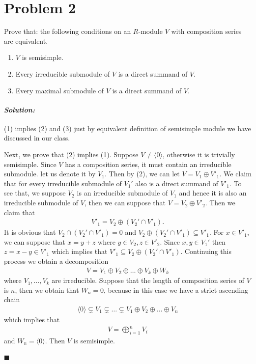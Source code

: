 \documentclass[12pt, a4paper]{article}
\theoremstyle{remark}
\newenvironment{solution}
  {\paragraph{\textit{Solution:}}\par\medskip}
  {\hfill$\blacksquare$\vspace{0.1cm}}
\begin{document}
\section*{Problem 2}
Prove that: the following conditions on an $R$-module $V$ with composition series are equivalent.
\begin{enumerate}
    \item[(1)] $V$ is semisimple.
    \item[(2)] Every irreducible submodule of $V$ is a direct summand of $V$.
    \item[(3)] Every maximal submodule of $V$ is a direct summand of $V$.
\end{enumerate}
\begin{solution}
    (1) implies (2) and (3) just by equivalent definition of semisimple module we have discussed in our class.
    
    Next, we prove that (2) implies (1).
    Suppose $V \neq \langle 0 \rangle$, otherwise it is trivially semisimple. Since $V$ has a composition series, it must contain an irreducible submodule. let us denote it by $V_1$.
    Then by (2), we can let $V=V_1\oplus V'_1$. We claim that for every irreducible submodule of $V_1'$ also is a direct summand of $V'_1$. To see that, we suppose $V_2$ is an irreducible submodule of $V_1$ and hence 
    it is also an irreducible submodule of $V$, then we can suppose that $V=V_2\oplus V'_2$. Then we claim that 
    \begin{align*}
        V'_1 = V_2\oplus (V_2'\cap V'_1).
    \end{align*}
    It is obvious that $V_2\cap(V_2'\cap V'_1)=0$ and $V_2\oplus (V_2'\cap V'_1) \subseteq V'_1$. For $x\in V'_1$, we can suppose that $x=y+z$ where $y\in V_2,z\in V'_2$.
    Since $x,y\in V_1'$ then $z=x-y\in V'_1$ which implies that $V'_1\subseteq V_2\oplus (V_2'\cap V'_1)$. 
    Continuing this process we obtain a decomposition
    \begin{align*}
        V = V_1\oplus V_2\oplus \dots \oplus V_k \oplus W_k
    \end{align*}
    where $V_1,\dots,V_k$ are irreducible. Suppose that the length of composition series of $V$ is $n$, then we obtain that $W_n=0$, because in this case we have a strict ascending chain 
    \begin{align*}
        \langle 0\rangle \subsetneq V_1\subsetneq \dots \subsetneq V_1\oplus V_2\oplus \dots \oplus V_n
    \end{align*} 
    which implies that 
    \begin{align*}
        V = \bigoplus_{i=1}^n V_i
    \end{align*}
    and $W_n=\langle 0 \rangle$. Then $V$ is semisimple.


\end{solution}
\end{document}
